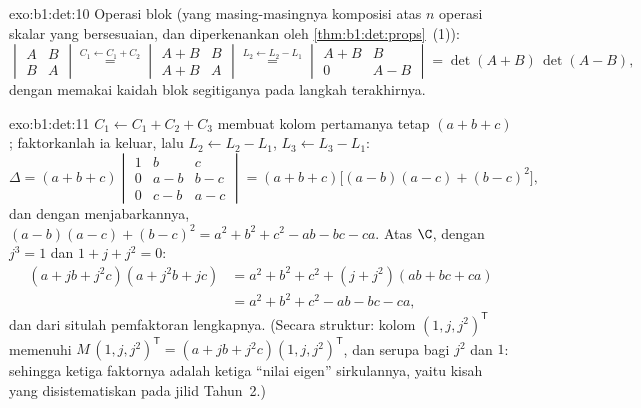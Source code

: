 \begin{solution}{exo:b1:det:10}
Operasi blok (yang masing-masingnya komposisi atas $n$ operasi skalar
yang bersesuaian, dan diperkenankan oleh \cref{thm:b1:det:props}~(1)):
\[
\begin{vmatrix} A & B\\ B & A\end{vmatrix}
\overset{C_1 \leftarrow C_1 + C_2}{=}
\begin{vmatrix} A + B & B\\ A + B & A\end{vmatrix}
\overset{L_2 \leftarrow L_2 - L_1}{=}
\begin{vmatrix} A + B & B\\ 0 & A - B\end{vmatrix}
= \det(A+B)\,\det(A-B),
\]
dengan memakai kaidah blok segitiganya pada langkah terakhirnya.
\end{solution}

\begin{solution}{exo:b1:det:11}
$C_1 \leftarrow C_1 + C_2 + C_3$ membuat kolom pertamanya tetap
$(a + b + c)$; faktorkanlah ia keluar, lalu $L_2 \leftarrow L_2 - L_1$,
$L_3 \leftarrow L_3 - L_1$:
\[
\Delta = (a+b+c)\begin{vmatrix}
1 & b & c\\
0 & a - b & b - c\\
0 & c - b & a - c
\end{vmatrix}
= (a+b+c)\bigl[(a-b)(a-c) + (b-c)^2\bigr],
\]
dan dengan menjabarkannya, $(a-b)(a-c) + (b-c)^2 = a^2 + b^2 + c^2 - ab - bc
- ca$. Atas $\C$, dengan $j^3 = 1$ dan $1 + j + j^2 = 0$:
\begin{align*}
(a + jb + j^2c)(a + j^2b + jc)
&= a^2 + b^2 + c^2 + (j + j^2)(ab + bc + ca)\\
&= a^2 + b^2 + c^2 - ab - bc - ca ,
\end{align*}
dan dari situlah pemfaktoran lengkapnya. (Secara struktur: kolom
$(1, j, j^2)^{\mathsf T}$ memenuhi $M\,(1, j, j^2)^{\mathsf T}
= (a + jb + j^2c)(1, j, j^2)^{\mathsf T}$, dan serupa bagi
$j^2$ dan $1$: sehingga ketiga faktornya adalah ketiga ``nilai eigen''
sirkulannya, yaitu kisah yang disistematiskan pada jilid Tahun~2.)
\end{solution}


